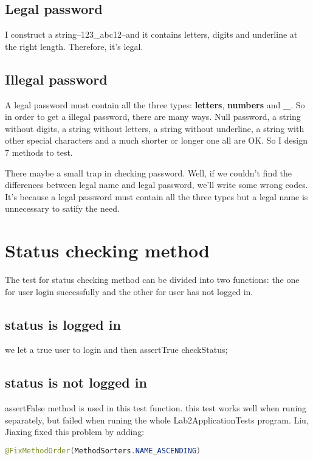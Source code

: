 \documentclass[a4paper]{report}
\begin{document}
\subsection{Legal password}
\par I construct a string--123\_abc12--and it contains letters, digits and underline at the right length. Therefore, it's legal.
\subsection{Illegal password}
\par A legal password must contain all the three types: \textbf{letters}, \textbf{numbers} and \textbf{\_}. So in order to get a illegal password, there are many ways. Null password, a string without digits, a string without letters, a string without underline, a string with other special characters and a much shorter or longer one all are OK. So I design 7 methods to test. 
\par There maybe a small trap in checking password. Well, if we couldn't find the differences between legal name and legal password,  we'll write some wrong codes. It's because a legal password must contain all the three types but a legal name is unnecessary to satify the need.
\section{Status checking method}
\par The test for status checking method can be divided into two functions: the one for user login successfully and the other for user has not logged in.
\subsection{status is logged in }
\par we let a true user to login and then assertTrue checkStatus;

\subsection{status is not logged in}
\par assertFalse method is used in this test function.
this test works well when runing separately, but failed when runing the whole Lab2ApplicationTests program.
Liu, Jiaxing fixed this problem by adding:
\begin{lstlisting}[language=java]
    @FixMethodOrder(MethodSorters.NAME_ASCENDING)
\end{lstlisting}
\end{document}
